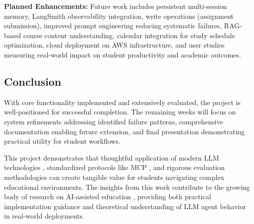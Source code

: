 \documentclass{article}
\begin{document}
\textbf{Planned Enhancements:} Future work includes persistent multi-session memory, LangSmith observability integration, write operations (assignment submission), improved prompt engineering reducing systematic failures, RAG-based course content understanding, calendar integration for study schedule optimization, cloud deployment on AWS infrastructure, and user studies measuring real-world impact on student productivity and academic outcomes.

\subsection{Conclusion}

With core functionality implemented and extensively evaluated, the project is well-positioned for successful completion. The remaining weeks will focus on system refinements addressing identified failure patterns, comprehensive documentation enabling future extension, and final presentation demonstrating practical utility for student workflows.

This project demonstrates that thoughtful application of modern LLM technologies \cite{anthropic2025multiagent, llmmas2025software}, standardized protocols like MCP \cite{mcp2025landscape}, and rigorous evaluation methodologies can create tangible value for students navigating complex educational environments. The insights from this work contribute to the growing body of research on AI-assisted education \cite{education2025agentic}, providing both practical implementation guidance and theoretical understanding of LLM agent behavior in real-world deployments.





\appendix
\end{document}
